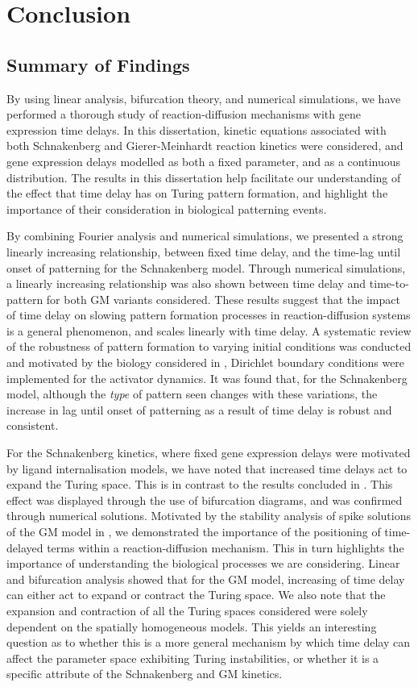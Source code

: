 \chapter{Conclusion}
\section{Summary of Findings}
By using linear analysis, bifurcation theory, and numerical simulations, we have performed a thorough study of reaction-diffusion mechanisms with gene expression time delays. In this dissertation, kinetic equations associated with both Schnakenberg and Gierer-Meinhardt reaction kinetics were considered, and gene expression delays modelled as both a fixed parameter, and as a continuous distribution. The results in this dissertation help facilitate our understanding of the effect that time delay has on Turing pattern formation, and highlight the importance of their consideration in biological patterning events.

By combining Fourier analysis and numerical simulations, we presented a strong linearly increasing relationship, between fixed time delay, and the time-lag until onset of patterning for the Schnakenberg model. Through numerical simulations, a linearly increasing relationship was also shown between time delay and time-to-pattern for both GM variants considered. These results suggest that the impact of time delay on slowing pattern formation processes in reaction-diffusion systems is a general phenomenon, and scales linearly with time delay. A systematic review of the robustness of pattern formation to varying initial conditions was conducted and motivated by the biology considered in \cite{krausemixed}, Dirichlet boundary conditions were implemented for the activator dynamics. It was found that, for the Schnakenberg model, although the \textit{type} of pattern seen changes with these variations, the increase in lag until onset of patterning as a result of time delay is robust and consistent.

For the Schnakenberg kinetics, where fixed gene expression delays were motivated by ligand internalisation models, we have noted that increased time delays act to expand the Turing space. This is in contrast to the results concluded in \cite{yigaffneyli}. This effect was displayed through the use of bifurcation diagrams, and was confirmed through numerical solutions.
Motivated by the stability analysis of spike solutions of the GM model in \cite{fadai1,fadai2}, we demonstrated the importance of the positioning of time-delayed terms within a reaction-diffusion mechanism. This in turn highlights the importance of understanding the biological processes we are considering. Linear and bifurcation analysis showed that for the GM model, increasing of time delay can either act to expand or contract the Turing space. We also note that the expansion and contraction of all the Turing spaces considered were solely dependent on the spatially homogeneous models. This yields an interesting question as to whether this is a more general mechanism by which time delay can affect the parameter space exhibiting Turing instabilities, or whether it is a specific attribute of the Schnakenberg and GM kinetics.

